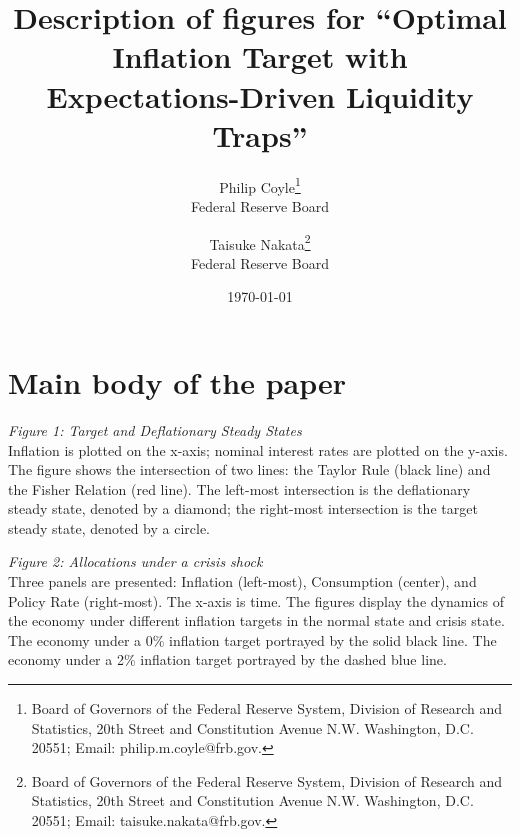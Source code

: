 \documentclass[11pt]{article}
\begin{document}
	
	\title{Description of figures for ``Optimal Inflation Target with\\Expectations-Driven Liquidity Traps''}
	\author{
		Philip Coyle\thanks{Board of Governors of the Federal Reserve System, Division of Research and Statistics, 20th Street and Constitution Avenue N.W. Washington, D.C. 20551; Email: philip.m.coyle@frb.gov.}\\
		Federal Reserve Board
		\and 
		Taisuke Nakata\thanks{Board of Governors of the Federal Reserve System, Division of Research and Statistics, 20th Street and Constitution Avenue N.W. Washington, D.C. 20551; Email: taisuke.nakata@frb.gov.}\\
		Federal Reserve Board
	}
	\date{\mydate\today}
	
	\maketitle
	
	\section*{Main body of the paper}
	\noindent \emph{Figure 1: Target and Deflationary Steady States}\\
	\noindent Inflation is plotted on the x-axis; nominal interest rates are plotted on the y-axis. The figure shows the intersection of two lines: the Taylor Rule (black line) and the Fisher Relation (red line). The left-most intersection is the deflationary steady state, denoted by a diamond; the right-most intersection is the target steady state, denoted by a circle. \vspace{0.5cm}
	
	\noindent \emph{Figure 2: Allocations under a crisis shock}\\
	\noindent Three panels are presented: Inflation (left-most), Consumption (center), and Policy Rate (right-most). The x-axis is time. The figures display the dynamics of the economy under different inflation targets in the normal state and crisis state. The economy under a 0\% inflation target portrayed by the solid black line. The economy under a 2\% inflation target portrayed by the dashed blue line.\vspace{0.5cm}
	
\end{document}

